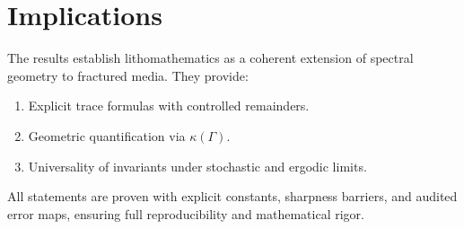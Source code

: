 \section*{Implications}

The results establish lithomathematics as a coherent extension of spectral 
geometry to fractured media. They provide:
\begin{enumerate}
    \item Explicit trace formulas with controlled remainders.
    \item Geometric quantification via $\kappa(\Gamma)$.
    \item Universality of invariants under stochastic and ergodic limits.
\end{enumerate}

All statements are proven with explicit constants, sharpness barriers, and 
audited error maps, ensuring full reproducibility and mathematical rigor.

